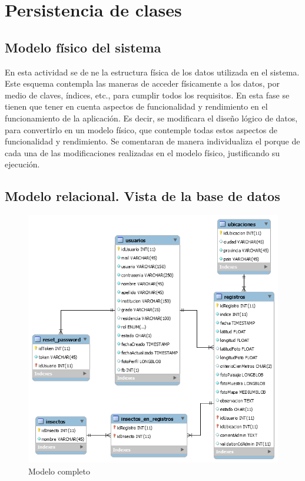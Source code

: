 \section{Persistencia de clases}

    \subsection{Modelo físico del sistema}
        En esta actividad se dene la estructura física de los datos utilizada en el sistema. 
        Este esquema contempla las maneras de acceder físicamente a los datos, por medio de claves, índices, etc., para cumplir todos los requisitos. 
        En esta fase se tienen que tener en cuenta aspectos de funcionalidad y rendimiento en el funcionamiento de la aplicación. Es decir, se modificara el diseño lógico de datos, para convertirlo en un modelo físico, que contemple todas estos aspectos de funcionalidad y rendimiento. Se comentaran de manera individualiza el porque de cada una de las modificaciones realizadas en el modelo físico, justificando su ejecución.

		\subsection{Modelo relacional. Vista de la base de datos}
			\begin{figure}[H]
				\centering
				\includegraphics[width=1\textwidth]{imagenes/implementacion/db.png}
				\caption{Modelo completo}
				\label{diagrama-despliegue}
			\end{figure}